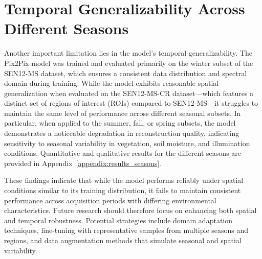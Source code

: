 \section{Temporal Generalizability Across Different Seasons}
Another important limitation lies in the model’s temporal generalizability. The Pix2Pix model was trained and evaluated primarily on the winter subset of the SEN12-MS dataset, which ensures a consistent data distribution and spectral domain during training. While the model exhibits reasonable spatial generalization when evaluated on the SEN12-MS-CR dataset—which features a distinct set of regions of interest (ROIs) compared to SEN12-MS—it struggles to maintain the same level of performance across different seasonal subsets. In particular, when applied to the summer, fall, or spring subsets, the model demonstrates a noticeable degradation in reconstruction quality, indicating sensitivity to seasonal variability in vegetation, soil moisture, and illumination conditions. Quantitative and qualitative results for the different seasons are provided in Appendix~\ref{appendix:results_seasons}.

These findings indicate that while the model performs reliably under spatial conditions similar to its training distribution, it fails to maintain consistent performance across acquisition periods with differing environmental characteristics. Future research should therefore focus on enhancing both spatial and temporal robustness. Potential strategies include domain adaptation techniques, fine-tuning with representative samples from multiple seasons and regions, and data augmentation methods that simulate seasonal and spatial variability.
